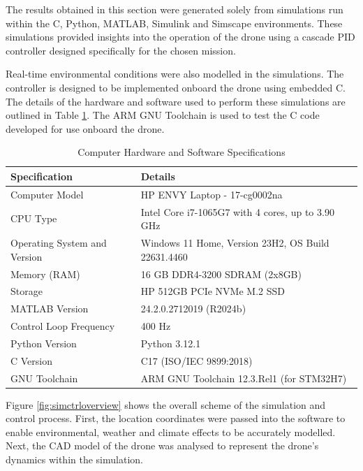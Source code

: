 The results obtained in this section were generated solely from simulations run within the C, Python, MATLAB, Simulink and Simscape environments. These simulations provided insights into the operation of the drone using a cascade \gls{PID} controller designed specifically for the chosen mission.  

Real-time environmental conditions were also modelled in the simulations. The controller is designed to be implemented onboard the drone using embedded C. The details of the hardware and software used to perform these simulations are outlined in Table \ref{tab:computersetup}. The ARM GNU Toolchain is used to test the C code developed for use onboard the drone.  
\begin{table}[h]
\vspace{5mm}
\begin{center}
\begin{tabular}{| p{6cm}|p{10cm}|}
 \hline
 \textbf{Specification}       & Details\\ 
 \hline
 Computer Model                & HP ENVY Laptop - 17-cg0002na          \\ 
 CPU Type                     & Intel Core i7-1065G7 with 4 cores, up to 3.90 GHz \\ 
 Operating System and Version & Windows 11 Home, Version 23H2, OS Build 22631.4460 \\ 
 Memory (RAM)                 & 16 GB DDR4-3200 SDRAM (2x8GB)      \\  
 Storage                      & HP 512GB PCIe NVMe M.2 SSD            \\ 
 MATLAB Version               & 24.2.0.2712019 (R2024b) \\
 Control Loop Frequency&400 Hz\\ 
  Python Version& Python 3.12.1\\
 C Version&C17 (ISO/IEC 9899:2018)\\ 
 GNU Toolchain& ARM GNU Toolchain 12.3.Rel1 (for STM32H7)\\ 
 \hline
\end{tabular}
\end{center}
\caption{Computer Hardware and Software Specifications}
\label{tab:computersetup}
\end{table}

Figure \ref{fig:simctrloverview} shows the overall scheme of the simulation and control process. First, the location coordinates were passed into the software to enable environmental, weather and climate effects to be accurately modelled. Next, the \gls{CAD} model of the drone was analysed to represent the drone's dynamics within the simulation.

